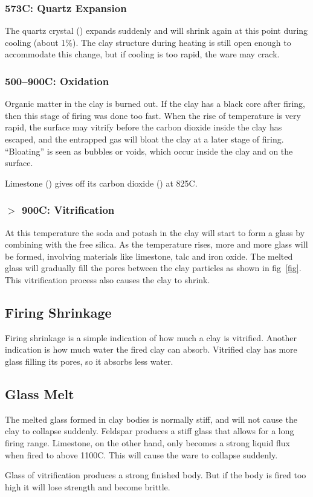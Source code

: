 \subsubsection{573\degree C: Quartz Expansion}
The quartz crystal () expands suddenly and will shrink again at this 
point during cooling (about 1\%). The clay structure during heating is still 
open enough to accommodate this change, but if cooling is too rapid, the ware 
may crack.
\subsubsection{500--900\degree C: Oxidation}
Organic matter in the clay is burned out. If the clay has a black core after 
firing, then this stage of firing was done too fast. When the rise of 
temperature is very rapid, the surface may vitrify before the carbon dioxide 
inside the clay has escaped, and the entrapped gas will bloat the clay at a 
later stage of firing. ``Bloating'' is seen as bubbles or voids, which occur 
inside the clay and on the surface.

Limestone () gives off its carbon dioxide () at 825\degree C.
\subsubsection{$>$ 900\degree C: Vitrification}
At this temperature the soda and potash in the clay will start to form a glass 
by combining with the free silica. As the temperature rises, more and more 
glass will be formed, involving materials like limestone, talc and iron oxide. 
The melted glass will gradually fill the pores between the clay particles as 
shown in fig~\ref{fig}. This vitrification process also causes the clay to 
shrink.
\subsection{Firing Shrinkage}
Firing shrinkage is a simple indication of how much a clay is vitrified. 
Another indication is how much water the fired clay can absorb. Vitrified clay 
has more glass filling its pores, so it absorbs less water.
\subsection{Glass Melt}
The melted glass formed in clay bodies is normally stiff, and will not cause 
the clay to collapse suddenly. Feldspar produces a stiff glass that allows for 
a long firing range. Limestone, on the other hand, only becomes a strong liquid 
flux when fired to above 1100\degree C. This will cause the ware to collapse 
suddenly.

Glass of vitrification produces a strong finished body. But if the body is 
fired too high it will lose strength and become brittle.
